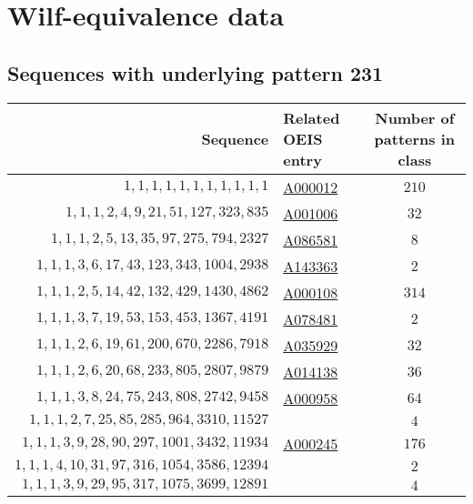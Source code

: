 \chapter{Wilf-equivalence data}
\section{Sequences with underlying pattern 231}
\begin{longtabu}{|r|l|c|}
    \hline
    Sequence & Related OEIS entry & Number of patterns in class\\
    \hline
    \endfirsthead
    \hline
    \endhead
    \hline
    \endfoot
    \(1,    1,    1,    1,    1,    1,    1,    1,    1,    1,     1\)  & \href{http://oeis.org/A000012}{A000012} &\(210\)\\
    \(1,    1,    1,    2,    4,    9,   21,   51,  127,  323,   835\)  & \href{http://oeis.org/A001006}{A001006} &\(32\)\\
    \(1,    1,    1,    2,    5,   13,   35,   97,  275,  794,  2327\)  & \href{http://oeis.org/A086581}{A086581} &\(8\)\\
    \(1,    1,    1,    3,    6,   17,   43,  123,  343, 1004,  2938\)  & \href{http://oeis.org/A143363}{A143363} &\(2\)\\
    \(1,    1,    1,    2,    5,   14,   42,  132,  429, 1430,  4862\)  & \href{http://oeis.org/A000108}{A000108} &\(314\)\\
    \(1,    1,    1,    3,    7,   19,   53,  153,  453, 1367,  4191\)  & \href{http://oeis.org/A078481}{A078481} &\(2\)\\
    \(1,    1,    1,    2,    6,   19,   61,  200,  670, 2286,  7918\)  & \href{http://oeis.org/A035929}{A035929} &\(32\)\\
    \(1,    1,    1,    2,    6,   20,   68,  233,  805, 2807,  9879\)  & \href{http://oeis.org/A014138}{A014138} &\(36\)\\
    \(1,    1,    1,    3,    8,   24,   75,  243,  808, 2742,  9458\)  & \href{http://oeis.org/A000958}{A000958} &\(64\)\\
    \(1,    1,    1,    2,    7,   25,   85,  285,  964, 3310, 11527\)  &  &\(4\)\\
    \(1,    1,    1,    3,    9,   28,   90,  297, 1001, 3432, 11934\)  & \href{http://oeis.org/A000245}{A000245} &\(176\)\\
    \(1,    1,    1,    4,   10,   31,   97,  316, 1054, 3586, 12394\)  &  &\(2\)\\
    \(1,    1,    1,    3,    9,   29,   95,  317, 1075, 3699, 12891\)  &  &\(4\)\\

\end{longtabu}
